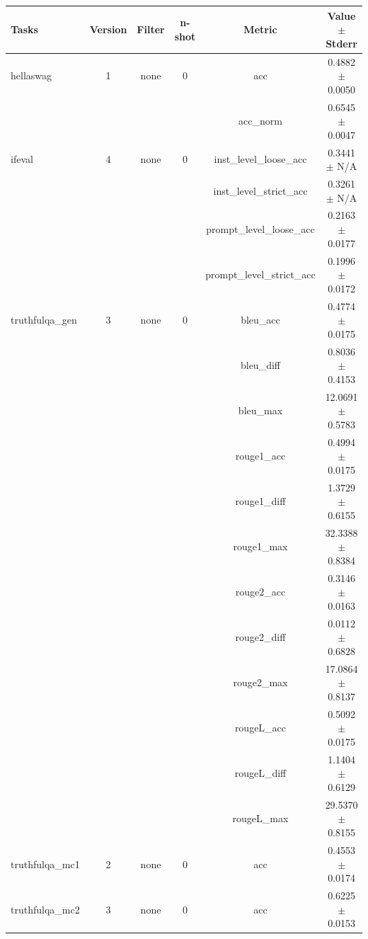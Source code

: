 \documentclass{ifacconf}
\begin{document}
	\begin{strip}
		\begin{minipage}{\textwidth}
			\begin{table}[H]
				\centering
				\begin{tabular}{|l|c|c|c|c|c|}
					\hline
					\textbf{Tasks} & \textbf{Version} & \textbf{Filter} & \textbf{n-shot} & \textbf{Metric} & \textbf{Value} $\pm$ \textbf{Stderr} \\ \hline
					hellaswag & 1 & none & 0 & acc & 0.4882 $\pm$ 0.0050 \\ \hline
					& & & & acc\_norm & 0.6545 $\pm$ 0.0047 \\ \hline
					ifeval & 4 & none & 0 & inst\_level\_loose\_acc & 0.3441 $\pm$ N/A \\ \hline
					& & & & inst\_level\_strict\_acc & 0.3261 $\pm$ N/A \\ \hline
					& & & & prompt\_level\_loose\_acc & 0.2163 $\pm$ 0.0177 \\ \hline
					& & & & prompt\_level\_strict\_acc & 0.1996 $\pm$ 0.0172 \\ \hline
					truthfulqa\_gen & 3 & none & 0 & bleu\_acc & 0.4774 $\pm$ 0.0175 \\ \hline
					& & & & bleu\_diff & 0.8036 $\pm$ 0.4153 \\ \hline
					& & & & bleu\_max & 12.0691 $\pm$ 0.5783 \\ \hline
					& & & & rouge1\_acc & 0.4994 $\pm$ 0.0175 \\ \hline
					& & & & rouge1\_diff & 1.3729 $\pm$ 0.6155 \\ \hline
					& & & & rouge1\_max & 32.3388 $\pm$ 0.8384 \\ \hline
					& & & & rouge2\_acc & 0.3146 $\pm$ 0.0163 \\ \hline
					& & & & rouge2\_diff & 0.0112 $\pm$ 0.6828 \\ \hline
					& & & & rouge2\_max & 17.0864 $\pm$ 0.8137 \\ \hline
					& & & & rougeL\_acc & 0.5092 $\pm$ 0.0175 \\ \hline
					& & & & rougeL\_diff & 1.1404 $\pm$ 0.6129 \\ \hline
					& & & & rougeL\_max & 29.5370 $\pm$ 0.8155 \\ \hline
					truthfulqa\_mc1 & 2 & none & 0 & acc & 0.4553 $\pm$ 0.0174 \\ \hline
					truthfulqa\_mc2 & 3 & none & 0 & acc & 0.6225 $\pm$ 0.0153 \\ \hline
				\end{tabular}
				\label{tab:gemma2_q8}
			\end{table}
			

\end{minipage}
\end{strip}
\end{document}
